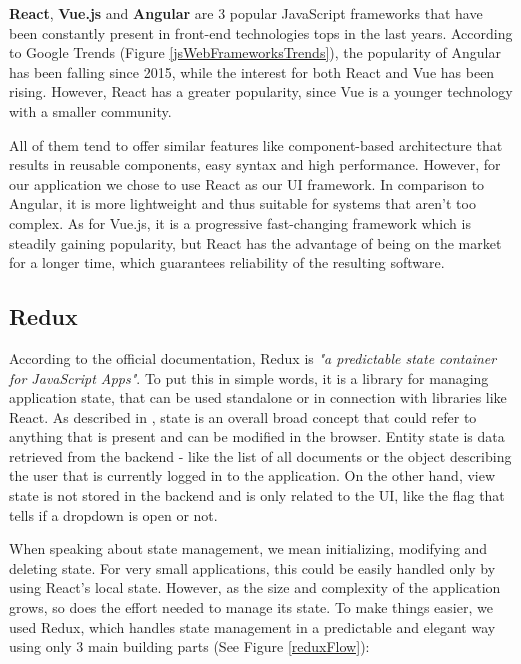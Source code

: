\textbf{React}, \textbf{Vue.js} and \textbf{Angular} are 3 popular JavaScript frameworks that have been constantly present in front-end technologies tops in the last years. According to Google Trends (Figure \ref{jsWebFrameworksTrends}), the popularity of Angular has been falling since 2015, while the interest for both React and Vue has been rising. However, React has a greater popularity, since Vue is a younger technology with a smaller community.

All of them tend to offer similar features like component-based architecture that results in reusable components, easy syntax and high performance. However, for our application we chose to use React as our UI framework. In comparison to Angular, it is more lightweight and thus suitable for systems that aren't too complex. As for Vue.js, it is a progressive fast-changing framework which is steadily gaining popularity, but React has the advantage of being on the market for a longer time, which guarantees reliability of the resulting software.


\subsection{Redux}
\label{section:redux}

According to the official documentation, Redux is \textit{"a predictable state container for JavaScript Apps"}. To put this in simple words, it is a library for managing application state, that can be used standalone or in connection with libraries like React. As described in \cite{tamingTheStateInReact}, state is an overall broad concept that could refer to anything that is present and can be modified in the browser. Entity state is data retrieved from the backend - like the list of all documents or the object describing the user that is currently logged in to the application. On the other hand, view state is not stored in the backend and is only related to the UI, like the flag that tells if a dropdown is open or not.

When speaking about state management, we mean initializing, modifying and deleting state. For very small applications, this could be easily handled only by using React's local state. However, as the size and complexity of the application grows, so does the effort needed to manage its state. To make things easier, we used Redux, which handles state management in a predictable and elegant way using only 3 main building parts (See Figure \ref{reduxFlow}):

